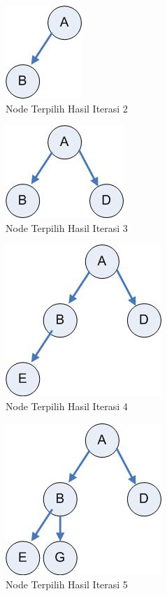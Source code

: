 \begin{enumerate}
\begin{figure}[htbp]
\begin{center}
	\includegraphics[scale=0.5]{fig/sunario-3/AB.jpg}%
	\caption{Node Terpilih Hasil Iterasi 2}%
\end{center}
\end{figure}


\begin{figure}[htbp]
\begin{center}
	\includegraphics[scale=0.5]{fig/sunario-3/ABD.jpg}%
	\caption{Node Terpilih Hasil Iterasi 3}%
\end{center}
\end{figure}

\begin{figure}[htbp]
\begin{center}
	\includegraphics[scale=0.5]{fig/sunario-3/ABDE.jpg}%
	\caption{Node Terpilih Hasil Iterasi 4}%
\end{center}
\end{figure}


\begin{figure}[htbp]
\begin{center}
	\includegraphics[scale=0.5]{fig/sunario-3/ABDEG.jpg}%
	\caption{Node Terpilih Hasil Iterasi 5}%
\end{center}
\end{figure}


\end{enumerate}
